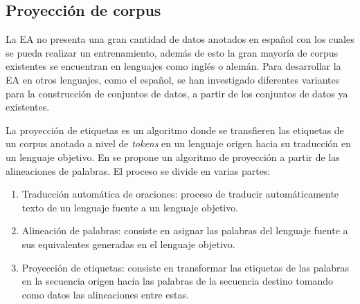 \documentclass[a4paper,11pt,twocolumn,twoside]{article}
\begin{document}

\subsection{Proyección de corpus} %

La EA no presenta una gran cantidad de datos anotados en español con los cuales se pueda realizar 
un entrenamiento, además de esto la gran mayoría de corpus existentes se encuentran en lenguajes como inglés o alemán.
Para desarrollar la EA en otros lenguajes, como el español, se han investigado diferentes variantes
para la construcción de conjuntos de datos, a partir de los conjuntos de datos ya existentes.

La proyección de etiquetas es un algoritmo donde se 
transfieren las etiquetas de un corpus anotado a nivel de \textit{tokens} en un lenguaje origen hacia su traducción en un
lenguaje objetivo. En \cite{eger2018cross} se propone un algoritmo de proyección a partir de las alineaciones de 
palabras. El proceso se divide en varias partes:

\begin{enumerate}
	\item Traducción automática de oraciones: proceso de
	traducir automáticamente texto de un lenguaje fuente a un lenguaje objetivo.
	\item Alineación de palabras: consiste en asignar las palabras del lenguaje fuente
	a sus equivalentes generadas en el lenguaje objetivo.
	\item Proyección de etiquetas: consiste en transformar las etiquetas de las palabras en la secuencia origen
	hacia las palabras de la secuencia destino tomando como datos las alineaciones entre estas.
\end{enumerate}
\end{document}
